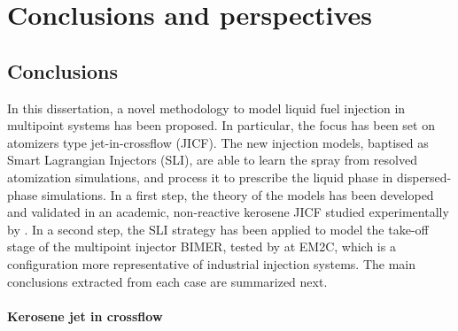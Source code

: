 \chapter{Conclusions and perspectives}

\section*{Conclusions}

In this dissertation, a novel methodology to model liquid fuel injection in multipoint systems has been proposed. In particular, the focus has been set on atomizers type jet-in-crossflow (JICF). The new injection models, baptised as Smart Lagrangian Injectors (SLI), are able to learn the spray from resolved atomization simulations, and process it to prescribe the liquid phase in dispersed-phase simulations. In a first step, the theory of the models has been developed and validated in an academic, non-reactive kerosene JICF studied experimentally by . In a second step, the SLI strategy has been applied to model the take-off stage of the multipoint injector BIMER, tested by  at EM2C, which is a configuration more representative of industrial injection systems. The main conclusions extracted from each case are summarized next.


\subsubsection*{Kerosene jet in crossflow}

